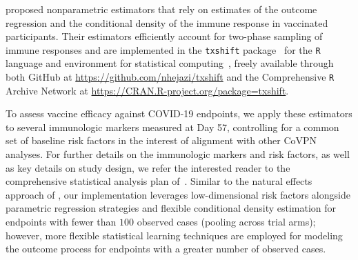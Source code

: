 \citet{hejazi2020efficient} proposed nonparametric estimators that rely on
estimates of the outcome regression and the conditional density of the immune
response in vaccinated participants. Their estimators efficiently account for
two-phase sampling of immune responses and are implemented in the
\texttt{txshift} package~\citep{hejazi2020txshift-joss} for the \texttt{R}
language and environment for statistical computing~\citep{R}, freely available
through both GitHub at \url{https://github.com/nhejazi/txshift} and the
Comprehensive \texttt{R} Archive Network at
\url{https://CRAN.R-project.org/package=txshift}.

To assess vaccine efficacy against COVID-19 endpoints, we apply these estimators
to several immunologic markers measured at Day 57, controlling for a common set
of baseline risk factors in the interest of alignment with other CoVPN analyses.
For further details on the immunologic markers and risk factors, as well as key
details on study design, we refer the interested reader to the comprehensive
statistical analysis plan of~\citet{gilbert2021covpn}. Similar to the natural
effects approach of \citet{benkeser2021inference}, our implementation leverages
low-dimensional risk factors alongside parametric regression strategies and
flexible conditional density estimation for endpoints with fewer than $100$
observed cases (pooling across trial arms); however, more flexible statistical
learning techniques are employed for modeling the outcome process for endpoints
with a greater number of observed cases.

